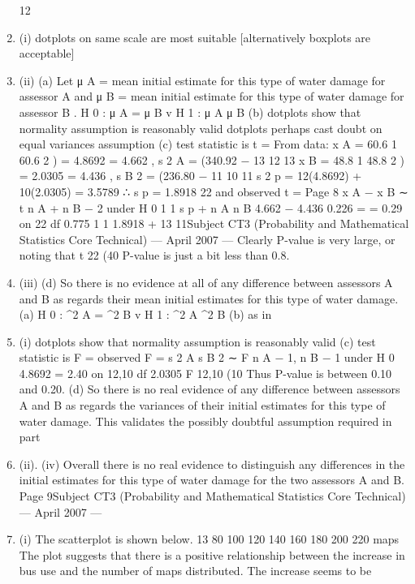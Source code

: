\documentclass[a4paper,12pt]{article}
\begin{document}
\begin{enumerate}
12
\item (i)
dotplots on same scale are most suitable
[alternatively boxplots are acceptable]
\item (ii)
(a)
Let μ A = mean initial estimate for this type of water damage for assessor A and μ B = mean initial estimate for this type of water damage
for assessor B .
H 0 : μ A = μ B v H 1 : μ A \neq μ B
(b) dotplots show that normality assumption is reasonably valid
dotplots perhaps cast doubt on equal variances assumption
(c) test statistic is t =
From data: x A = 60.6
1
60.6 2
) = 4.8692
= 4.662 , s 2 A = (340.92 −
13
12
13
x B = 48.8
1
48.8 2
) = 2.0305
= 4.436 , s B 2 = (236.80 −
11
10
11
s 2 p = 12(4.8692) + 10(2.0305)
= 3.5789 ∴ s p = 1.8918
22
and
observed t =
Page 8
x A − x B
∼ t n A + n B − 2 under H 0
1
1
s p
+
n A n B
4.662 − 4.436
0.226
=
= 0.29 on 22 df
0.775
1 1
1.8918
+
13 11Subject CT3 (Probability and Mathematical Statistics Core Technical) — April 2007 — %
Clearly P-value is very large, or noting that t 22 (40%
P-value is just a bit less than 0.8.
\item (iii)
(d) So there is no evidence at all of any difference between assessors A
and B as regards their mean initial estimates for this type of water
damage.
(a) H 0 : \sigma^2 A = \sigma^2 B v H 1 : \sigma^2 A \neq \sigma^2 B
(b) as in \item (i) dotplots show that normality assumption is reasonably valid
(c) test statistic is F =
observed F =
s 2 A
s B 2
∼ F n A − 1, n B − 1 under H 0
4.8692
= 2.40 on 12,10 df
2.0305
F 12,10 (10%
Thus P-value is between 0.10 and 0.20.
(d)
So there is no real evidence of any difference between assessors A and B as regards the variances of their initial estimates for this type of water damage.
This validates the possibly doubtful assumption required in part \item (ii).
(iv)
Overall there is no real evidence to distinguish any differences in the initial
estimates for this type of water damage for the two assessors A and B.
Page 9Subject CT3 (Probability and Mathematical Statistics Core Technical) — April 2007 — %
\item (i)
The scatterplot is shown below.
13
80
100
120
140
160
180
200
220
maps
The plot suggests that there is a positive relationship between the increase in
bus use and the number of maps distributed. The increase seems to be

\end{enumerate}
\end{document}
